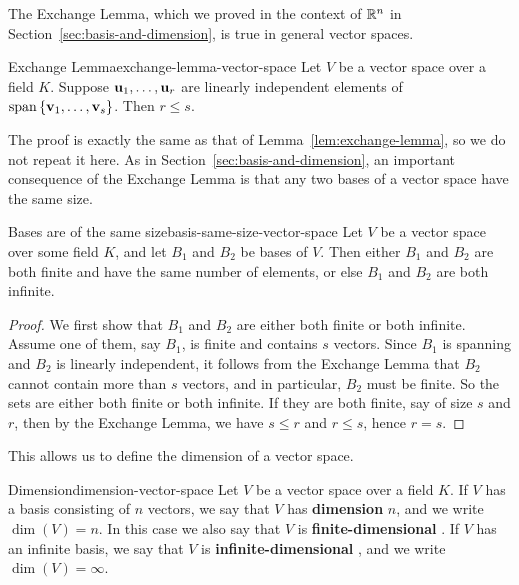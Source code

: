 The Exchange Lemma, which we proved in the context of $\mathbb{R}^n$ in
Section~\ref{sec:basis-and-dimension}, is true in general vector
spaces.

\begin{lemma}{Exchange Lemma}{exchange-lemma-vector-space}
  Let $V$ be a vector space over a field $K$. Suppose
  $\vect{u}_{1},\ldots,\vect{u}_{r}$ are linearly independent elements
  of $\sspan\set{\vect{v}_{1},\ldots,\vect{v}_{s}}$. Then $r\leq s$.
\end{lemma}

The proof is exactly the same as that of
Lemma~\ref{lem:exchange-lemma}, so we do not repeat it here.  As in
Section~\ref{sec:basis-and-dimension}, an important consequence of the
Exchange Lemma is that any two bases of a vector space have the same
size.

\begin{theorem}{Bases are of the same size}{basis-same-size-vector-space}
  Let $V$ be a vector space over some field $K$, and let $B_1$ and
  $B_2$ be bases of $V$. Then either $B_1$ and $B_2$ are both finite
  and have the same number of elements, or else $B_1$ and $B_2$ are
  both infinite.
\end{theorem}

\begin{proof}
  We first show that $B_1$ and $B_2$ are either both finite or both
  infinite. Assume one of them, say $B_1$, is finite and contains $s$
  vectors. Since $B_1$ is spanning and $B_2$ is linearly independent,
  it follows from the Exchange Lemma that $B_2$ cannot contain more
  than $s$ vectors, and in particular, $B_2$ must be finite.  So the
  sets are either both finite or both infinite. If they are both
  finite, say of size $s$ and $r$, then by the Exchange Lemma, we have
  $s\leq r$ and $r\leq s$, hence $r=s$.
\end{proof}

This allows us to define the dimension of a vector space.

\begin{definition}{Dimension}{dimension-vector-space}
  Let $V$ be a vector space over a field $K$. If $V$ has a basis
  consisting of $n$ vectors, we say that $V$ has \textbf{dimension}%
   $n$, and we write $\dim(V)=n$. In
  this case we also say that $V$ is \textbf{finite-dimensional}%
  . If $V$ has an infinite
  basis, we say that $V$ is \textbf{infinite-dimensional}%
  , and we write
  $\dim(V) = \infty$.
\end{definition}

